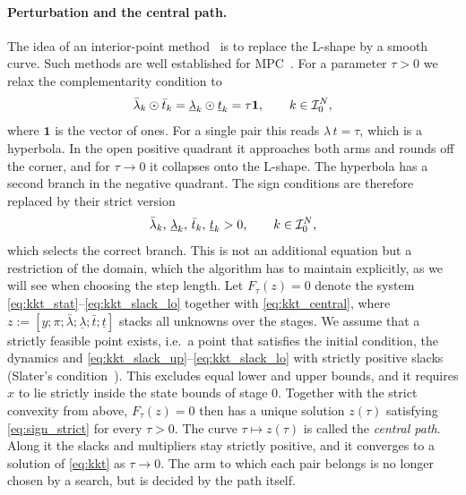 \paragraph{Perturbation and the central path.}
The idea of an interior-point method~\cite{wright1997primal,nocedal2006numerical} is to replace the L-shape by a smooth curve.
Such methods are well established for MPC~\cite{rao1998application,domahidi2012efficient,frison2020hpipm}.
For a parameter $\tau > 0$ we relax the complementarity condition to
\begin{equation} \label{eq:kkt_central}
    \bar{\lambda}_k \odot \bar{t}_k = \underline{\lambda}_k \odot \underline{t}_k = \tau \mathbf{1}, \qquad k\in\mathcal{I}_{0}^{N},
\end{equation}
where $\mathbf{1}$ is the vector of ones.
For a single pair this reads $\lambda\, t = \tau$, which is a hyperbola.
In the open positive quadrant it approaches both arms and rounds off the corner, and for $\tau \to 0$ it collapses onto the L-shape.
The hyperbola has a second branch in the negative quadrant.
The sign conditions are therefore replaced by their strict version
\begin{equation} \label{eq:sign_strict}
    \bar{\lambda}_k,\, \underline{\lambda}_k,\, \bar{t}_k,\, \underline{t}_k > 0, \qquad k\in\mathcal{I}_{0}^{N},
\end{equation}
which selects the correct branch.
This is not an additional equation but a restriction of the domain, which the algorithm has to maintain explicitly, as we will see when choosing the step length.
Let $F_\tau(z) = 0$ denote the system \eqref{eq:kkt_stat}--\eqref{eq:kkt_slack_lo} together with \eqref{eq:kkt_central}, where $z := [y; \pi; \bar{\lambda}; \underline{\lambda}; \bar{t}; \underline{t}]$ stacks all unknowns over the stages.
We assume that a strictly feasible point exists, i.e.\ a point that satisfies the initial condition, the dynamics and \eqref{eq:kkt_slack_up}--\eqref{eq:kkt_slack_lo} with strictly positive slacks (Slater's condition~\cite{boyd2004convex}).
This excludes equal lower and upper bounds, and it requires $\hat{x}$ to lie strictly inside the state bounds of stage $0$.
Together with the strict convexity from above, $F_\tau(z) = 0$ then has a unique solution $z(\tau)$ satisfying \eqref{eq:sign_strict} for every $\tau > 0$.
The curve $\tau \mapsto z(\tau)$ is called the \textit{central path}.
Along it the slacks and multipliers stay strictly positive, and it converges to a solution of \eqref{eq:kkt} as $\tau \to 0$.
The arm to which each pair belongs is no longer chosen by a search, but is decided by the path itself.

